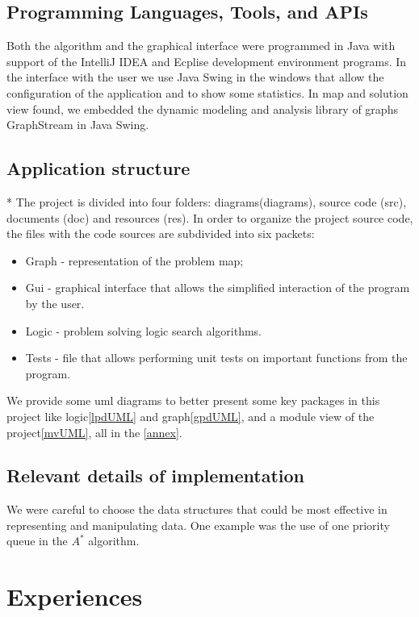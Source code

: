 \documentclass[a4paper]{article}
\begin{document}
\subsection{Programming Languages, Tools, and APIs}

Both the algorithm and the graphical interface were programmed in Java with
support of the IntelliJ IDEA and Ecplise development environment programs. In the interface with the user we use Java Swing in the windows that allow the configuration of the application and to show some statistics. In map and solution view found, we embedded the dynamic modeling and analysis library of graphs GraphStream in Java Swing.

\subsection{Application structure}
*
The project is divided into four folders: diagrams(diagrams), source code (src), documents (doc) and resources (res). In order to organize the project source code, the files with the code sources are subdivided into six packets:

\begin{itemize}
\item Graph - representation of the problem map;
\item Gui - graphical interface that allows the simplified interaction of the program by the user.
\item Logic - problem solving logic search algorithms.
\item Tests - file that allows performing unit tests on important functions
from the program.

\end{itemize}

We provide some uml diagrams to better present some key packages in this project like logic\ref{lpdUML} and graph\ref{gpdUML}, and a module view of the project\ref{mvUML}, all in the \ref{annex}.

\subsection{Relevant details of implementation}

We were careful to choose the data structures that could be most effective in representing and manipulating data.
One example was the use of one priority queue in the $A^*$ algorithm.

\section{Experiences}
\end{document}
